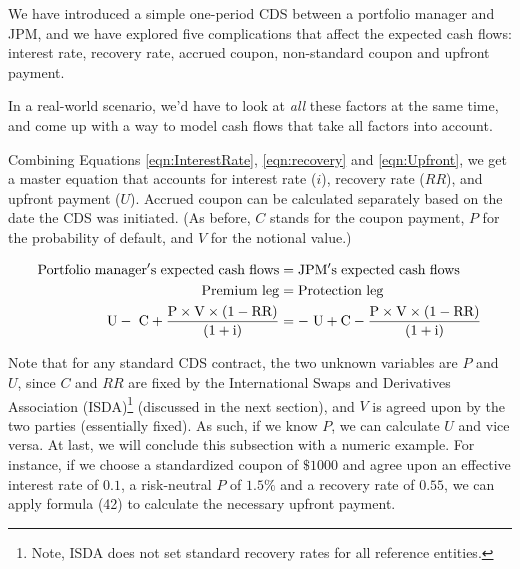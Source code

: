 \documentclass{jss}
\begin{document}
We have introduced a simple one-period CDS between a portfolio manager and JPM, and we have explored five complications that affect the expected cash flows: interest rate, recovery rate, accrued coupon, non-standard coupon and upfront payment.

In a real-world scenario, we'd have to look at \emph{all} these factors at the same time, and come up with a way to model cash flows that take all factors into account.

Combining Equations \ref{eqn:InterestRate}, \ref{eqn:recovery} and \ref{eqn:Upfront}, we get a master equation that accounts for interest rate ($i$), recovery rate ($RR$), and upfront payment ($U$). Accrued coupon can be calculated separately based on the date the CDS was initiated. (As before, $C$ stands for the coupon payment, $P$ for the probability of default, and $V$ for the notional value.)

\begin{align}
  \rm Portfolio\hspace{3pt}manager's\hspace{3pt}expected\hspace{3pt}cash\hspace{3pt}flows &= \rm JPM's\hspace{3pt}expected\hspace{3pt}cash\hspace{3pt}flows \\
  \rm Premium\hspace{3pt}leg &= \rm Protection\hspace{3pt}leg \\
  \rm U -\hspace{3pt}C + \frac{P \times V \times (1 - RR)}{(1 + i)}  &= \rm -\hspace{3pt}U + C - \frac{P \times V \times (1 - RR)}{(1 + i)}
\end{align}

Note that for any standard CDS contract, the two unknown variables are $P$ and $U$, since $C$ and $RR$ are fixed by the International Swaps and Derivatives Association (ISDA)\footnote{Note, ISDA does not set standard recovery rates for all reference entities.} (discussed in the next section), and $V$ is agreed upon by the two parties (essentially fixed). As such, if we know $P$, we can calculate $U$ and vice versa. At last, we will conclude this subsection with a numeric example. For instance, if we choose a standardized coupon of $\$1000$ and agree upon an effective interest rate of $0.1$, a risk-neutral $P$ of $1.5\%$ and a recovery rate of $0.55$, we can apply formula (42) to calculate the necessary upfront payment. \\
\end{document}
